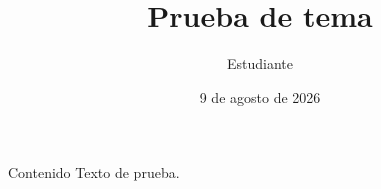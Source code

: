 \documentclass[aspectratio=169]{beamer}
\title{Prueba de tema}
\author{Estudiante}
\date{9 de agosto de 2026}
\begin{document}
\begin{frame}{Contenido}
  Texto de prueba.
\end{frame}
\end{document}
